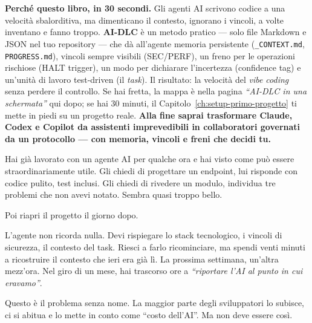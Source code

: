 ﻿%

\chapter*{\LabelIntroduction}
\label{ch:introduzione}

\begin{tipbox}
\textbf{Perché questo libro, in 30 secondi.} Gli agenti AI scrivono codice a una velocità sbalorditiva, ma dimenticano il contesto, ignorano i vincoli, a volte inventano e fanno troppo. \textbf{AI-DLC} è un metodo pratico --- solo file Markdown e JSON nel tuo repository --- che dà all'agente memoria persistente (\texttt{\_CONTEXT.md}, \texttt{PROGRESS.md}), vincoli sempre visibili (SEC/PERF), un freno per le operazioni rischiose (HALT trigger), un modo per dichiarare l'incertezza (confidence tag) e un'unità di lavoro test-driven (il \textit{task}). Il risultato: la velocità del \textit{vibe coding} senza perdere il controllo. Se hai fretta, la mappa è nella pagina \textit{``AI-DLC in una schermata''} qui dopo; se hai 30 minuti, il Capitolo~\ref{ch:setup-primo-progetto} ti mette in piedi su un progetto reale. \textbf{Alla fine saprai trasformare Claude, Codex e Copilot da assistenti imprevedibili in collaboratori governati da un protocollo --- con memoria, vincoli e freni che decidi tu.}
\end{tipbox}

Hai già lavorato con un agente AI per qualche ora e hai visto come può essere straordinariamente utile. Gli chiedi di progettare un endpoint, lui risponde con codice pulito, test inclusi. Gli chiedi di rivedere un modulo, individua tre problemi che non avevi notato. Sembra quasi troppo bello.

Poi riapri il progetto il giorno dopo.

L'agente non ricorda nulla. Devi rispiegare lo stack tecnologico, i vincoli di sicurezza, il contesto del task. Riesci a farlo ricominciare, ma spendi venti minuti a ricostruire il contesto che ieri era già lì. La prossima settimana, un'altra mezz'ora. Nel giro di un mese, hai trascorso ore a \textit{``riportare l'AI al punto in cui eravamo''}.

Questo è il problema senza nome. La maggior parte degli sviluppatori lo subisce, ci si abitua e lo mette in conto come ``costo dell'AI''. Ma non deve essere così.

